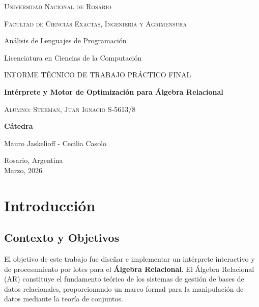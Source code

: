 \documentclass[12pt]{report}
\begin{document}
\begin{titlepage}
    \centering
    {\Large \textsc{Universidad Nacional de Rosario}\par}
    \vspace{0.8cm}
    {\large \textsc{Facultad de Ciencias Exactas, Ingeniería y Agrimensura}\par}
    \vspace{1.8cm}
    {\Large Análisis de Lenguajes de Programación\par}
    \vspace{0.3cm}
    {\large Licenciatura en Ciencias de la Computación\par}
    \vspace{1.5cm}
    {\large \textsc{INFORME TÉCNICO DE TRABAJO PRÁCTICO FINAL}\par}
    \vspace{0.4cm}
    {\Huge \textbf{Intérprete y Motor de Optimización para Álgebra Relacional}\par}
    \vspace{2.5cm}
    {\large \textsc{Alumno: Steeman, Juan Ignacio \quad S-5613/8}\par}
    \vfill
    {\large \textbf{Cátedra}\par}
    {\large Mauro Jaskelioff - Cecilia Casolo\par}
    \vspace{1.5cm}
    {\large Rosario, Argentina \\ Marzo, 2026\par}
\end{titlepage}

\tableofcontents
\newpage

\chapter{Introducción}

\section{Contexto y Objetivos}
El objetivo de este trabajo fue diseñar e implementar un intérprete interactivo y de procesamiento por lotes para el \textbf{Álgebra Relacional}. El Álgebra Relacional (AR) constituye el fundamento teórico de los sistemas de gestión de bases de datos relacionales, proporcionando un marco formal para la manipulación de datos mediante la teoría de conjuntos.
\end{document}
